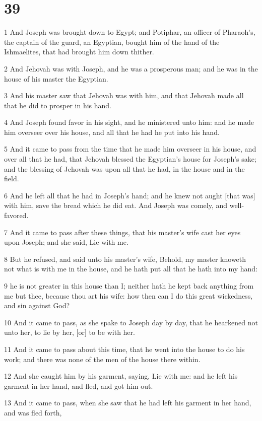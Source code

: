 \chapter{39}

\par 1 And Joseph was brought down to Egypt; and Potiphar, an officer of Pharaoh's, the captain of the guard, an Egyptian, bought him of the hand of the Ishmaelites, that had brought him down thither.
\par 2 And Jehovah was with Joseph, and he was a prosperous man; and he was in the house of his master the Egyptian.
\par 3 And his master saw that Jehovah was with him, and that Jehovah made all that he did to prosper in his hand.
\par 4 And Joseph found favor in his sight, and he ministered unto him: and he made him overseer over his house, and all that he had he put into his hand.
\par 5 And it came to pass from the time that he made him overseer in his house, and over all that he had, that Jehovah blessed the Egyptian's house for Joseph's sake; and the blessing of Jehovah was upon all that he had, in the house and in the field.
\par 6 And he left all that he had in Joseph's hand; and he knew not aught [that was] with him, save the bread which he did eat. And Joseph was comely, and well-favored.
\par 7 And it came to pass after these things, that his master's wife cast her eyes upon Joseph; and she said, Lie with me.
\par 8 But he refused, and said unto his master's wife, Behold, my master knoweth not what is with me in the house, and he hath put all that he hath into my hand:
\par 9 he is not greater in this house than I; neither hath he kept back anything from me but thee, because thou art his wife: how then can I do this great wickedness, and sin against God?
\par 10 And it came to pass, as she spake to Joseph day by day, that he hearkened not unto her, to lie by her, [or] to be with her.
\par 11 And it came to pass about this time, that he went into the house to do his work; and there was none of the men of the house there within.
\par 12 And she caught him by his garment, saying, Lie with me: and he left his garment in her hand, and fled, and got him out.
\par 13 And it came to pass, when she saw that he had left his garment in her hand, and was fled forth,
